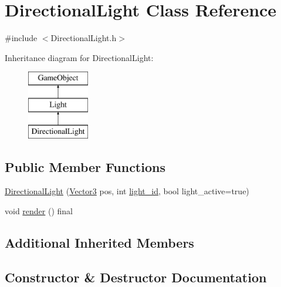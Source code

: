\hypertarget{class_directional_light}{}\section{Directional\+Light Class Reference}
\label{class_directional_light}


{\ttfamily \#include $<$Directional\+Light.\+h$>$}

Inheritance diagram for Directional\+Light\+:\begin{figure}[H]
\begin{center}
\leavevmode
\includegraphics[height=3.000000cm]{class_directional_light}
\end{center}
\end{figure}
\subsection*{Public Member Functions}
\begin{DoxyCompactItemize}
\item 
\hyperlink{class_directional_light_a15e97766ae5a5fdd50c9429a79d37292}{Directional\+Light} (\hyperlink{class_vector3}{Vector3} pos, int \hyperlink{class_light_ae0028340ad3a9f2e196b68365d5fe972}{light\+\_\+id}, bool light\+\_\+active=true)
\item 
void \hyperlink{class_directional_light_aa56c9af208dd1bc66967d219297b6e67}{render} () final
\end{DoxyCompactItemize}
\subsection*{Additional Inherited Members}


\subsection{Constructor \& Destructor Documentation}
\mbox{\label{class_directional_light_a15e97766ae5a5fdd50c9429a79d37292}} 
